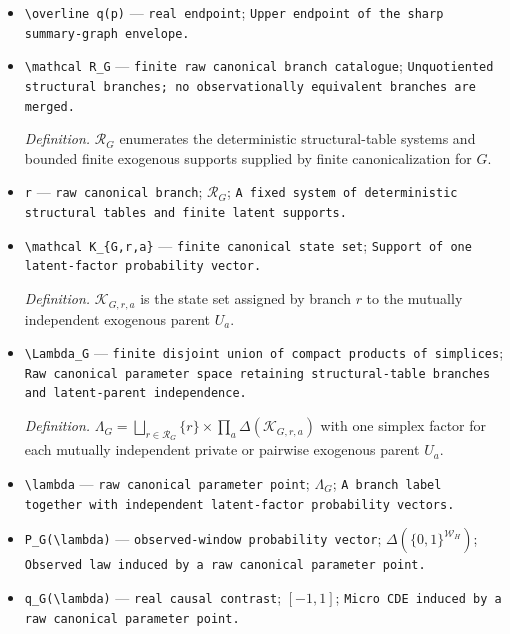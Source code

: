 \documentclass{article}
\begin{document}
\begin{itemize}
  \item \texttt{\textbackslash{}\allowbreak{}overline q(p)} --- \texttt{real endpoint}; \texttt{Upper endpoint of the sharp summary-\allowbreak{}graph envelope.}
  \item \texttt{\textbackslash{}\allowbreak{}mathcal R\_\allowbreak{}G} --- \texttt{finite raw canonical branch catalogue}; \texttt{Unquotiented structural branches;\allowbreak{} no observationally equivalent branches are merged.}
  \par\smallskip\noindent\emph{Definition.} \(\mathcal R_G\) enumerates the deterministic structural-table systems and bounded finite exogenous supports supplied by finite canonicalization for \(G\).
  \item \texttt{r} --- \texttt{raw canonical branch}; \(\mathcal R_G\); \texttt{A fixed system of deterministic structural tables and finite latent supports.}
  \item \texttt{\textbackslash{}\allowbreak{}mathcal K\_\allowbreak{}\{G,\allowbreak{}r,\allowbreak{}a\}\allowbreak{}} --- \texttt{finite canonical state set}; \texttt{Support of one latent-\allowbreak{}factor probability vector.}
  \par\smallskip\noindent\emph{Definition.} \(\mathcal K_{G,r,a}\) is the state set assigned by branch \(r\) to the mutually independent exogenous parent \(U_a\).
  \item \texttt{\textbackslash{}\allowbreak{}Lambda\_\allowbreak{}G} --- \texttt{finite disjoint union of compact products of simplices}; \texttt{Raw canonical parameter space retaining structural-\allowbreak{}table branches and latent-\allowbreak{}parent independence.}
  \par\smallskip\noindent\emph{Definition.} \(\Lambda_G=\bigsqcup_{r\in\mathcal R_G}\{r\}\times\prod_a\Delta(\mathcal K_{G,r,a})\) with one simplex factor for each mutually independent private or pairwise exogenous parent \(U_a\).
  \item \texttt{\textbackslash{}\allowbreak{}lambda} --- \texttt{raw canonical parameter point}; \(\Lambda_G\); \texttt{A branch label together with independent latent-\allowbreak{}factor probability vectors.}
  \item \texttt{P\_\allowbreak{}G(\textbackslash{}\allowbreak{}lambda)} --- \texttt{observed-\allowbreak{}window probability vector}; \(\Delta(\{0,1\}^{\mathcal W_H})\); \texttt{Observed law induced by a raw canonical parameter point.}
  \item \texttt{q\_\allowbreak{}G(\textbackslash{}\allowbreak{}lambda)} --- \texttt{real causal contrast}; \([-1,1]\); \texttt{Micro CDE induced by a raw canonical parameter point.}

\end{itemize}
\end{document}

